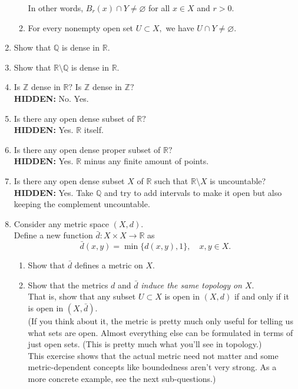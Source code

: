 \documentclass[12pt]{article}
\theoremstyle{definition}
\numberwithin{thm}{section}
\let\emptyset\varnothing
\newcommand{\hint}[1]{\textbf{HIDDEN:} {\color[rgb]{0.95, 0.95, 0.95}#1}}
\begin{document}
\begin{enumerate}
\begin{enumerate}
		In other words, $B_r(x) \cap Y \neq \emptyset$ for all $x \in X$ and $r > 0.$
		\item For every nonempty open set $U \subset X,$ we have $U \cap Y \neq \emptyset.$	
	\end{enumerate}
	\item Show that $\mathbb{Q}$ is dense in $\mathbb{R}.$
	\item Show that $\mathbb{R} \setminus \mathbb{Q}$ is dense in $\mathbb{R}.$
	\item Is $\mathbb{Z}$ dense in $\mathbb{R}?$ Is $\mathbb{Z}$ dense in $\mathbb{Z}?$\\
	\hint{No. Yes.}
	\item Is there any open dense subset of $\mathbb{R}?$\\
	\hint{Yes. $\mathbb{R}$ itself.}
	\item Is there any open dense proper subset of $\mathbb{R}?$\\
	\hint{Yes. $\mathbb{R}$ minus any finite amount of points.}
	\item Is there any open dense subset $X$ of $\mathbb{R}$ such that $\mathbb{R} \setminus X$ is uncountable?\\
	\hint{Yes. Take $\mathbb{Q}$ and try to add intervals to make it open but also keeping the complement uncountable.}
	\item Consider any metric space $(X, d).$ \\
	Define a new function $\bar{d}: X\times X \to \mathbb{R}$ as
	\begin{equation*} 
		\bar{d}(x, y) = \min\{d(x, y), 1\}, \quad x, y \in X.
	\end{equation*}
	\begin{enumerate}
		\item Show that $\bar{d}$ defines a metric on $X.$
		\item Show that the metrics $d$ and $\bar{d}$ \emph{induce the same topology on $X.$}\\
		That is, show that any subset $U \subset X$ is open in $(X, d)$ if and only if it is open in $(X, \bar{d}).$\\
		(If you think about it, the metric is pretty much only useful for telling us what sets are open. Almost everything else can be formulated in terms of just open sets. (This is pretty much what you'll see in topology.)\\
		This exercise shows that the actual metric need not matter and some metric-dependent concepts like boundedness aren't very strong. As a more concrete example, see the next sub-questions.)	

\end{enumerate}
\end{enumerate}
\end{document}
